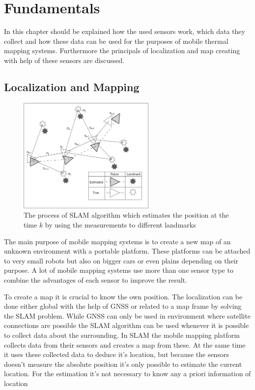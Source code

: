 \chapter{Fundamentals}\label{ch:fundamentals}
In this chapter should be explained how the used sensors work, which data they collect and how these data can be used for the purposes of mobile thermal mapping systems.
Furthermore the principals of localization and map creating with help of these sensors are discussed.

\section{Localization and Mapping}\label{sec:localizationAndMapping}

\begin{figure}
	\centering
	\includegraphics[width=0.60\textwidth]{img/fundamentals/slam.png}
	\caption{The process of SLAM algorithm which estimates the position at the time $k$ by using the measurements to different landmarks\cite{durrant-Whyte2006}}
	\label{fig:slam}
\end{figure}

The main purpose of mobile mapping systems is to create a new map of an unknown environment with a portable platform.
These platforms can be attached to very small robots but also on bigger cars or even plains depending on their purpose.
A lot of mobile mapping systems use more than one sensor type to combine the advantages of each sensor to improve the result.

To create a map it is crucial to know the own position.
The localization can be done either global with the help of \ac{GNSS} or related to a map frame by solving the \ac{SLAM} problem.
While \ac{GNSS} can only be used in environment where satellite connections are possible the \ac{SLAM} algorithm can be used whenever it is possible to collect data about the surrounding.
In \ac{SLAM} the mobile mapping platform collects data from their sensors and creates a map from these.
At the same time it uses these collected data to deduce it's location, but because the sensors doesn't measure the absolute position it's only possible to estimate the current location.
For the estimation it's not necessary to know any a priori information of location \cite{durrant-Whyte2006}

